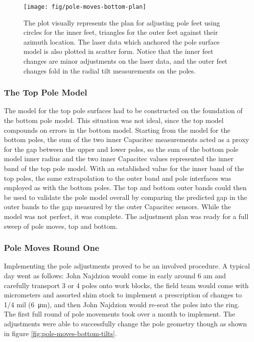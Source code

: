 \begin{figure}
\centering
\texttt{[image: fig/pole-moves-bottom-plan]}
\caption{
    The plot visually represents the plan for adjusting pole feet using circles for the inner feet, triangles for the outer feet against their azimuth location.  The laser data which anchored the pole surface model is also plotted in scatter form.  Notice that the inner feet changes are minor adjustments on the laser data, and the outer feet changes fold in the radial tilt measurements on the poles.
    \label{fig:pole-moves-bottom-plan}
}
\end{figure}

\subsubsection{The Top Pole Model}

The model for the top pole surfaces had to be constructed on the foundation of the bottom pole model.  This situation was not ideal, since the top model compounds on errors in the bottom model.  Starting from the model for the bottom poles, the sum of the two inner Capacitec measurements acted as a proxy for the gap between the upper and lower poles, so the sum of the bottom pole model inner radius and the two inner Capacitec values represented the inner band of the top pole model.  With an established value for the inner band of the top poles, the same extrapolation to the outer band and pole interfaces was employed as with the bottom poles.  The top and bottom outer bands could then be used to validate the pole model overall by comparing the predicted gap in the outer bands to the gap measured by the outer Capacitec sensors.  While the model was not perfect, it was complete.  The adjustment plan was ready for a full sweep of pole moves, top and bottom.


\subsubsection{Pole Moves Round One}

Implementing the pole adjustments proved to be an involved procedure.  A typical day went as follows: John Najdzion would come in early around 6 am and carefully transport 3 or 4 poles onto work blocks, the field team would come with micrometers and assorted shim stock to implement a prescription of changes to 1/4 mil (\SI{6}{\micro\meter}), and then John Najdzion would re-seat the poles into the ring.  The first full round of pole movements took over a month to implement.  The adjustments were able to successfully change the pole geometry though as shown in figure \ref{fig:pole-moves-bottom-tilts}.

